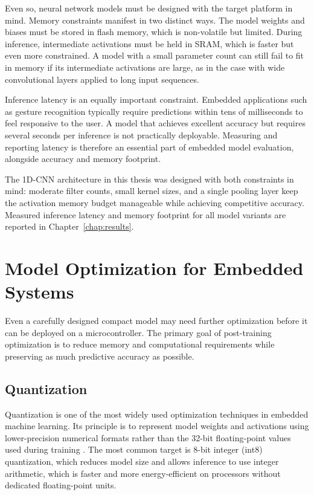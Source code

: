 Even so, neural network models must be designed with the target platform in mind. Memory constraints manifest in two distinct ways. The model weights and biases must be stored in flash memory, which is non-volatile but limited. During inference, intermediate activations must be held in SRAM, which is faster but even more constrained. A model with a small parameter count can still fail to fit in memory if its intermediate activations are large, as in the case with wide convolutional layers applied to long input sequences.

Inference latency is an equally important constraint. Embedded applications such as gesture recognition typically require predictions within tens of milliseconds to feel responsive to the user. A model that achieves excellent accuracy but requires several seconds per inference is not practically deployable. Measuring and reporting latency is therefore an essential part of embedded model evaluation, alongside accuracy and memory footprint.

The 1D-CNN architecture in this thesis was designed with both constraints in mind: moderate filter counts, small kernel sizes, and a single pooling layer keep the activation memory budget manageable while achieving competitive accuracy. Measured inference latency and memory footprint for all model variants are reported in Chapter~\ref{chap:results}.

\section{Model Optimization for Embedded Systems}
Even a carefully designed compact model may need further optimization before it can be deployed on a microcontroller. The primary goal of post-training optimization is to reduce memory and computational requirements while preserving as much predictive accuracy as possible.

\subsection{Quantization}
Quantization is one of the most widely used optimization techniques in embedded machine learning. Its principle is to represent model weights and activations using lower-precision numerical formats rather than the 32-bit floating-point values used during training \cite{jacob2017quantization}. The most common target is 8-bit integer (int8) quantization, which reduces model size and allows inference to use integer arithmetic, which is faster and more energy-efficient on processors without dedicated floating-point units.

